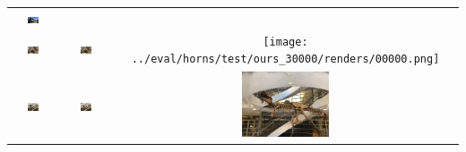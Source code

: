 \begin{tabular}{ccc}
            \includegraphics[width=0.26\textwidth]{../eval/train/test/ours_30000/renders/00000.png} \\
            \includegraphics[width=0.26\textwidth]{../o-3dgs/eval/horns/test/ours_30000/gt/00000.png} &
            \includegraphics[width=0.26\textwidth]{../o-3dgs/eval/horns/test/ours_30000/renders/00000.png} & 
            \texttt{[image: ../eval/horns/test/ours\_30000/renders/00000.png]} \\
            \includegraphics[width=0.26\textwidth]{../o-3dgs/eval/trex/test/ours_30000/gt/00000.png} &
            \includegraphics[width=0.26\textwidth]{../o-3dgs/eval/trex/test/ours_30000/renders/00000.png} & 
            \includegraphics[width=0.26\textwidth]{../eval/trex/test/ours_30000/renders/00000.png} \\
    \end{tabular}
    